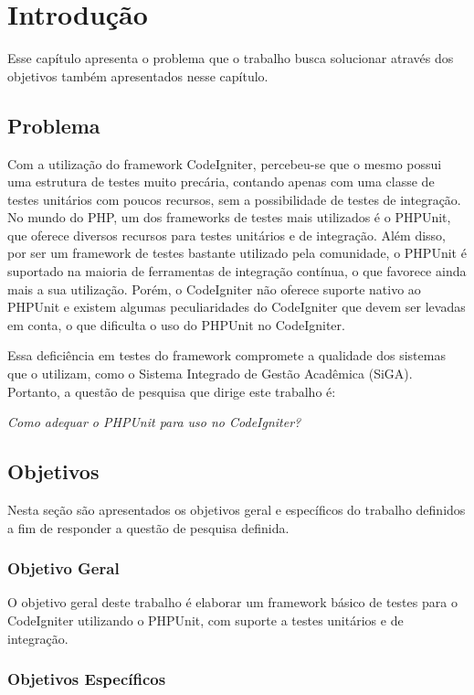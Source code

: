 \chapter[Introdução]{Introdução}

Esse capítulo apresenta o problema que o trabalho busca solucionar através dos objetivos também apresentados nesse capítulo.

\section{Problema}

Com a utilização do framework CodeIgniter, percebeu-se que o mesmo possui uma estrutura de testes muito precária, contando
apenas com uma classe de testes unitários com poucos recursos, sem a possibilidade de testes de integração. No mundo do PHP,
um dos frameworks de testes mais utilizados é o PHPUnit, que oferece diversos recursos para testes unitários e de integração.
Além disso, por ser um framework de testes bastante utilizado pela comunidade, o PHPUnit é suportado na maioria de ferramentas
de integração contínua, o que favorece ainda mais a sua utilização. Porém, o CodeIgniter não oferece suporte nativo ao PHPUnit
e existem algumas peculiaridades do CodeIgniter que devem ser levadas em conta, o que dificulta o uso do PHPUnit no CodeIgniter.

Essa deficiência em testes do framework compromete a qualidade dos sistemas que o utilizam,
como o Sistema Integrado de Gestão Acadêmica (SiGA). Portanto, a questão de pesquisa que dirige este trabalho é:

\textit{Como adequar o PHPUnit para uso no CodeIgniter?}
  
\section{Objetivos}

  Nesta seção são apresentados os objetivos geral e específicos do trabalho definidos a fim de responder a
  questão de pesquisa definida.

\subsection{Objetivo Geral}

O objetivo geral deste trabalho é elaborar um framework básico de testes para o CodeIgniter utilizando o PHPUnit, com suporte a 
testes unitários e de integração.

\subsection{Objetivos Específicos}

